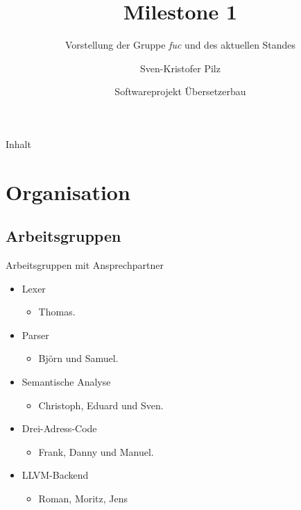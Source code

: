 \documentclass[ucs,10pt]{beamer}
\title[Milestone 1] %
{Milestone 1}
\subtitle
{Vorstellung der Gruppe \emph{fuc} und des aktuellen Standes}
\author[Pilz] %
{Sven-Kristofer Pilz}
\institute[FU Berlin] %
{Freie Universität Berlin}
\date[SWPCOM 2012] %
{Softwareprojekt Übersetzerbau}
\newlength{\wideitemsep}
\let\olditem\item
\renewcommand{\item}{\setlength{\itemsep}{\wideitemsep}\olditem}
\begin{document}
\begin{frame}[plain]
  \titlepage
\end{frame}

\begin{frame}{Inhalt}
  \tableofcontents
\end{frame}

\section{Organisation}

\subsection{Arbeitsgruppen}
\begin{frame}{Arbeitsgruppen mit Ansprechpartner}
  \begin{itemize}
  \item Lexer
  \begin{itemize}
  	\item Thomas.
  \end{itemize}
  
  \item Parser
  \begin{itemize}
	\item Björn und Samuel.
  \end{itemize}
  
  \item Semantische Analyse
  \begin{itemize}
  	\item Christoph, Eduard und Sven.
  \end{itemize}    
  
  \item Drei-Adress-Code
  \begin{itemize}
  	\item Frank, Danny und Manuel.
  \end{itemize}    
  
  \item LLVM-Backend
  \begin{itemize}
  	\item Roman, Moritz, Jens
  \end{itemize}
  \end{itemize}
\end{frame}
\end{document}
